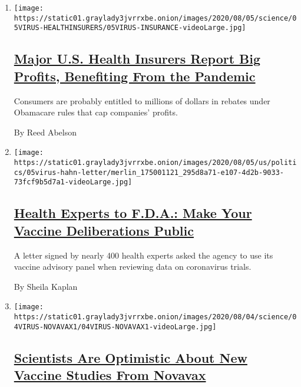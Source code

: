 \begin{enumerate}
\def\labelenumi{\arabic{enumi}.}
\item
  \texttt{[image: https://static01.graylady3jvrrxbe.onion/images/2020/08/05/science/05VIRUS-HEALTHINSURERS/05VIRUS-INSURANCE-videoLarge.jpg]}

  \hypertarget{major-us-health-insurers-report-big-profits-benefiting-from-the-pandemic}{%
  \subsection{\texorpdfstring{\href{/2020/08/05/health/covid-insurance-profits.html}{Major
  U.S. Health Insurers Report Big Profits, Benefiting From the
  Pandemic}}{Major U.S. Health Insurers Report Big Profits, Benefiting From the Pandemic}}\label{major-us-health-insurers-report-big-profits-benefiting-from-the-pandemic}}

  Consumers are probably entitled to millions of dollars in rebates
  under Obamacare rules that cap companies' profits.

  By Reed Abelson
\item
  \texttt{[image: https://static01.graylady3jvrrxbe.onion/images/2020/08/05/us/politics/05virus-hahn-letter/merlin\_175001121\_295d8a71-e107-4d2b-9033-73fcf9b5d7a1-videoLarge.jpg]}

  \hypertarget{health-experts-to-fda-make-your-vaccine-deliberations-public}{%
  \subsection{\texorpdfstring{\href{/2020/08/05/health/covid-19-vaccine-fda.html}{Health
  Experts to F.D.A.: Make Your Vaccine Deliberations
  Public}}{Health Experts to F.D.A.: Make Your Vaccine Deliberations Public}}\label{health-experts-to-fda-make-your-vaccine-deliberations-public}}

  A letter signed by nearly 400 health experts asked the agency to use
  its vaccine advisory panel when reviewing data on coronavirus trials.

  By Sheila Kaplan
\item
  \texttt{[image: https://static01.graylady3jvrrxbe.onion/images/2020/08/04/science/04VIRUS-NOVAVAX1/04VIRUS-NOVAVAX1-videoLarge.jpg]}

  \hypertarget{scientists-are-optimistic-about-new-vaccine-studies-from-novavax}{%
  \subsection{\texorpdfstring{\href{/2020/08/04/health/covid-19-vaccine-novavax.html}{Scientists
  Are Optimistic About New Vaccine Studies From
  Novavax}}{Scientists Are Optimistic About New Vaccine Studies From Novavax}}\label{scientists-are-optimistic-about-new-vaccine-studies-from-novavax}}


\end{enumerate}
